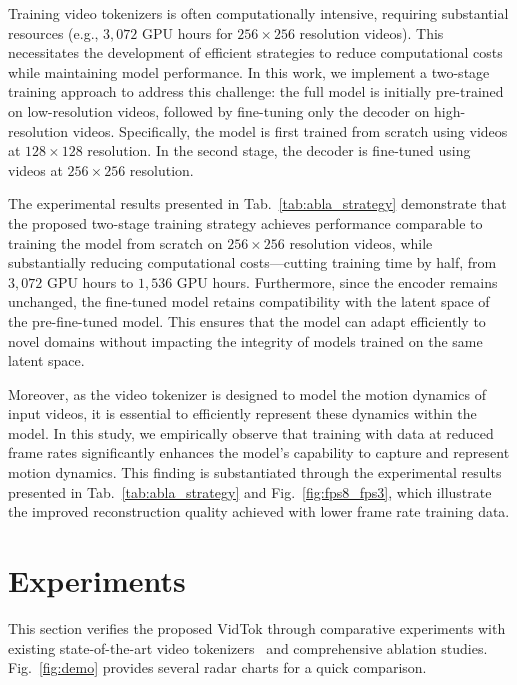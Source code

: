 \documentclass{article} %
\begin{document}
Training video tokenizers is often computationally intensive, requiring substantial resources (e.g., $3,072$ GPU hours for $256\times256$ resolution videos). This necessitates the development of efficient strategies to reduce computational costs while maintaining model performance. In this work, we implement a two-stage training approach to address this challenge: the full model is initially pre-trained on low-resolution videos, followed by fine-tuning only the decoder on high-resolution videos. Specifically, the model is first trained from scratch using videos at $128\times128$ resolution. In the second stage, the decoder is fine-tuned using videos at $256\times256$ resolution.

The experimental results presented in Tab.~\ref{tab:abla_strategy} demonstrate that the proposed two-stage training strategy achieves performance comparable to training the model from scratch on $256\times256$ resolution videos, while substantially reducing computational costs—cutting training time by half, from $3,072$ GPU hours to $1,536$ GPU hours. Furthermore, since the encoder remains unchanged, the fine-tuned model retains compatibility with the latent space of the pre-fine-tuned model. This ensures that the model can adapt efficiently to novel domains without impacting the integrity of models trained on the same latent space.

Moreover, as the video tokenizer is designed to model the motion dynamics of input videos, it is essential to efficiently represent these dynamics within the model. In this study, we empirically observe that training with data at reduced frame rates significantly enhances the model's capability to capture and represent motion dynamics. This finding is substantiated through the experimental results presented in Tab.~\ref{tab:abla_strategy} and Fig.~\ref{fig:fps8_fps3}, which illustrate the improved reconstruction quality achieved with lower frame rate training data.


\section{Experiments}
\label{sec:experiment}
This section verifies the proposed VidTok through comparative experiments with existing state-of-the-art video tokenizers~\citep{yu2024language,wang2024omnitokenizer,repocosmos,zhao2024cv,repoopensora,repoopensoraplan,yang2024cogvideox} and comprehensive ablation studies.
Fig.~\ref{fig:demo} provides several radar charts for a quick comparison.
\end{document}
